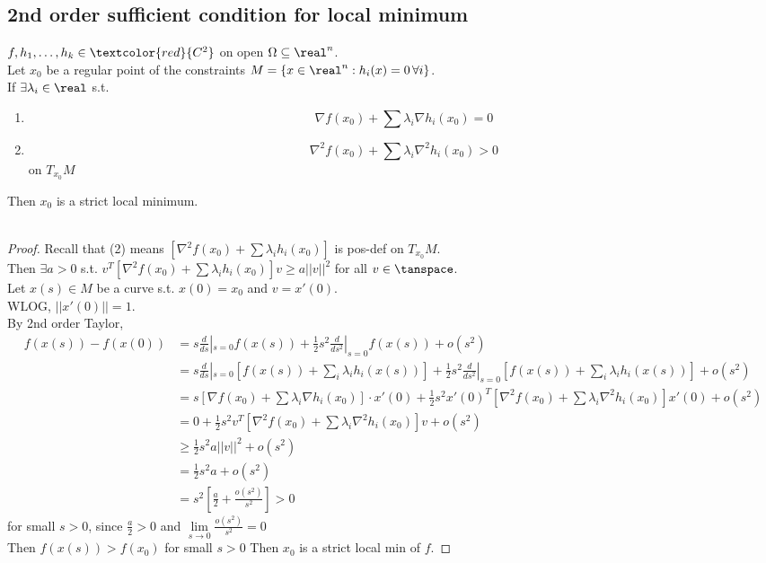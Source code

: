 \documentclass[11pt]{article}
\begin{document}
\subsection{2nd order sufficient condition for local minimum}
$f, h_1, \hdots, h_k \in \textcolor{red}{C^2}$ on open $\Omega \subseteq \real^n$. \\
Let $x_0$ be a regular point of the constraints $ M = \{ x \in \real^n: h_i(x) = 0 \, \forall i\}$. \\
If $\exists \lambda_i \in \real$ s.t.
\begin{enumerate}
	\item $$ \nabla f(x_0) + \sum \lambda_i \nabla h_i(x_0) = 0$$
	\item $$ \nabla^2 f(x_0) + \sum \lambda_i \nabla^2 h_i(x_0) > 0$$ on $T_{x_0} M$
\end{enumerate}
Then $x_0$ is a strict local minimum.\\\\
\begin{proof}
	Recall that (2) means $[\nabla^2 f(x_0) + \sum \lambda_i h_i(x_0)]$ is pos-def on $T_{x_0}M$. \\
	Then $ \exists a > 0$ s.t. $v^T [\nabla^2 f(x_0) + \sum \lambda_i h_i(x_0)] v \geq a||v||^2$ for all $v \in \tanspace$. \\
	Let $x(s) \in M$ be a curve s.t. $x(0) = x_0$ and $v = x'(0)$. \\
	WLOG, $||x'(0)|| = 1$.\\
	By 2nd order Taylor, 
	\begin{align*}
		f(x(s)) - f(x(0)) &= s\frac{d}{ds}|_{s=0} f(x(s)) + \frac{1}{2} s^2 \frac{d}{ds^2} |_{s=0} f(x(s)) + o(s^2)\\
		&= s\frac{d}{ds}|_{s=0} [f(x(s)) + \sum_i \lambda_i h_i(x(s)) ]+ \frac{1}{2} s^2 \frac{d}{ds^2}|_{s=0} [f(x(s)) + \sum_i \lambda_i h_i(x(s)) ] + o(s^2) \tag{$\sum_i \lambda_i h_i(x(s)) = 0$}\\
		&=  s[\nabla f(x_0) + \sum \lambda_i \nabla h_i(x_0)] \cdot x'(0) + \frac{1}{2}s^2x'(0)^T[\nabla^2f(x_0) + \sum \lambda_i \nabla^2h_i(x_0)] x'(0) + o(s^2) \\
		&= 0 + \frac{1}{2} s^2 v^T[\nabla^2f(x_0) + \sum \lambda_i \nabla^2h_i(x_0)]v + o(s^2) \\
		&\geq \frac{1}{2}s^2 a||v||^2 + o(s^2) \\
		&= \frac{1}{2}s^2 a + o(s^2) \\
		&= s^2 [\frac{a}{2} + \frac{o(s^2)}{s^2}] > 0
	\end{align*}
	for small $s >0$, since $\frac{a}{2} > 0$ and $\underset{s \rightarrow 0}{\lim} \frac{o(s^2)}{s^2} = 0$ \\
	Then $f(x(s)) > f(x_0)$ for small $s > 0$
	Then $x_0$ is a strict local min of $f$. 
\end{proof}
\end{document}
